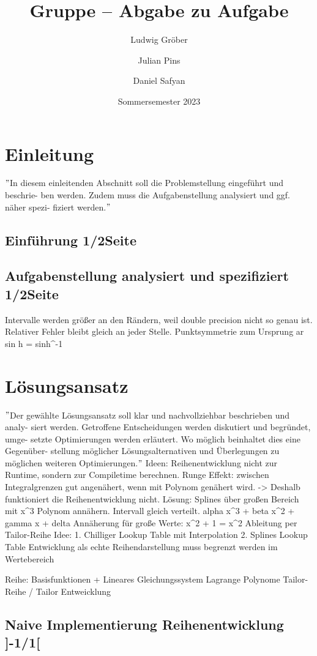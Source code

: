 \documentclass[course=erap]{aspdoc}
\author{Ludwig Gröber \and Julian Pins \and Daniel Safyan}
\date{Sommersemester 2023} %
\title{Gruppe \theGroup{} -- Abgabe zu Aufgabe \theNumber}
\begin{document}
\maketitle

\section{Einleitung}
\("\)In diesem einleitenden Abschnitt soll die Problemstellung eingeführt und beschrie- ben werden. Zudem muss die Aufgabenstellung analysiert und ggf. näher spezi- fiziert werden.\("\)
\subsection{Einführung 1/2Seite}

\subsection{Aufgabenstellung analysiert und spezifiziert 1/2Seite}
Intervalle werden größer an den Rändern, weil double precision nicht so genau ist.
Relativer Fehler bleibt gleich an jeder Stelle.
Punktsymmetrie zum Ursprung
ar sin h = sinh^-1


\section{Lösungsansatz}
\("\)Der gewählte Lösungsansatz soll klar und nachvollziehbar beschrieben und analy- siert werden. Getroffene Entscheidungen werden diskutiert und begründet, umge- setzte Optimierungen werden erläutert. Wo möglich beinhaltet dies eine Gegenüber- stellung möglicher Lösungsalternativen und Überlegungen zu möglichen weiteren Optimierungen.\("\)
Ideen: Reihenentwicklung nicht zur Runtime, sondern zur Compiletime berechnen.
Runge Effekt: zwischen Integralgrenzen gut angenähert, wenn mit Polynom genähert wird. -> Deshalb funktioniert die Reihenentwicklung nicht.
Lösung: Splines über großen Bereich mit x^3 Polynom annähern. Intervall gleich verteilt. alpha x^3 + beta x^2 + gamma x + delta
Annäherung für große Werte: x^2 + 1 = x^2
Ableitung per Tailor-Reihe
Idee: 1. Chilliger Lookup Table mit Interpolation 2. Splines Lookup Table
Entwicklung als echte Reihendarstellung muss begrenzt werden im Wertebereich

Reihe: Basisfunktionen + Lineares Gleichungssystem
Lagrange Polynome
Tailor-Reihe / Tailor Entweicklung

\subsection{Naive Implementierung Reihenentwicklung ]-1/1[}
\end{document}
